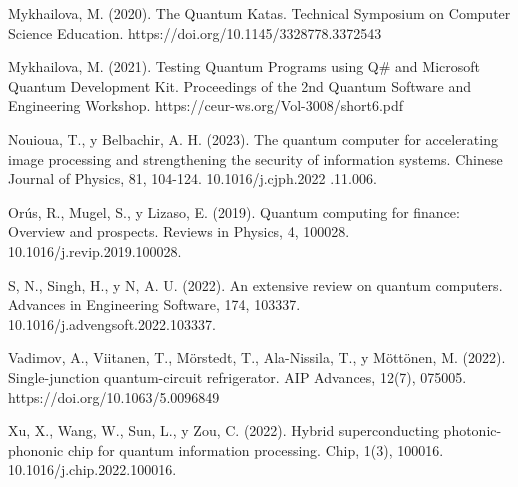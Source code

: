 \documentclass{article}
\begin{document}
Mykhailova, M. (2020). The Quantum Katas. Technical Symposium on Computer Science Education. https://doi.org/10.1145/3328778.3372543

Mykhailova, M. (2021). Testing Quantum Programs using Q# and Microsoft Quantum Development Kit. Proceedings of the 2nd Quantum Software and Engineering Workshop. https://ceur-ws.org/Vol-3008/short6.pdf 

Nouioua, T., y Belbachir, A. H. (2023). The quantum computer for accelerating image processing and strengthening the security of information systems. Chinese Journal of Physics, 81, 104-124. 10.1016/j.cjph.2022
.11.006. 

Orús, R., Mugel, S., y Lizaso, E. (2019). Quantum computing for finance: Overview and prospects. Reviews in Physics, 4, 100028. 10.1016/j.revip.2019.100028.

S, N., Singh, H., y N, A. U. (2022). An extensive review on quantum computers. Advances in Engineering Software, 174, 103337. 10.1016/j.advengsoft.2022.103337.

Vadimov, A., Viitanen, T., Mörstedt, T., Ala-Nissila, T., y Möttönen, M. (2022). Single-junction quantum-circuit refrigerator. AIP Advances, 12(7), 075005. https://doi.org/10.1063/5.0096849

Xu, X., Wang, W., Sun, L., y Zou, C. (2022). Hybrid superconducting photonic-phononic chip for quantum information processing. Chip, 1(3), 100016. 10.1016/j.chip.2022.100016.
\end{document}
